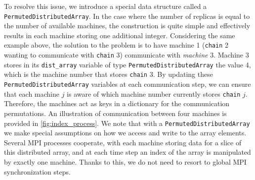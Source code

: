  
To resolve this issue, we introduce a special data structure called a 
\texttt{PermutedDistributedArray}. In the case where the number of replicas is 
equal to the number of available machines, the construction is quite simple
and effectively results in each machine storing one additional integer. 
Considering the same example above, the solution to the problem is to have
machine 1 (\texttt{chain} 2 wanting to communicate with \texttt{chain} 3) 
communicate with \textit{machine} 3. 
Machine 3 stores in its \texttt{dist\_array} variable of type 
\texttt{PermutedDistributedArray} the value 4, which is the machine number that 
stores \texttt{chain} 3. By updating these \texttt{PermutedDistributedArray} 
variables at each communication step, we can ensure that each machine $j$ is aware 
of which machine number currently stores \texttt{chain} $j$. 
Therefore, the machines act as keys in a dictionary for the communication 
permutations.
An illustration of communication between four machines is provided in 
\cref{fig:index_process}.
We note that with a \texttt{PermutedDistributedArray} we make special assumptions 
on how we access and write to the array elements. 
Several MPI processes cooperate, with each machine storing 
data for a slice of this distributed array, and at each time 
step an index of the array is manipulated by exactly one machine. 
Thanks to this, we do not need to resort to global MPI synchronization steps. 

